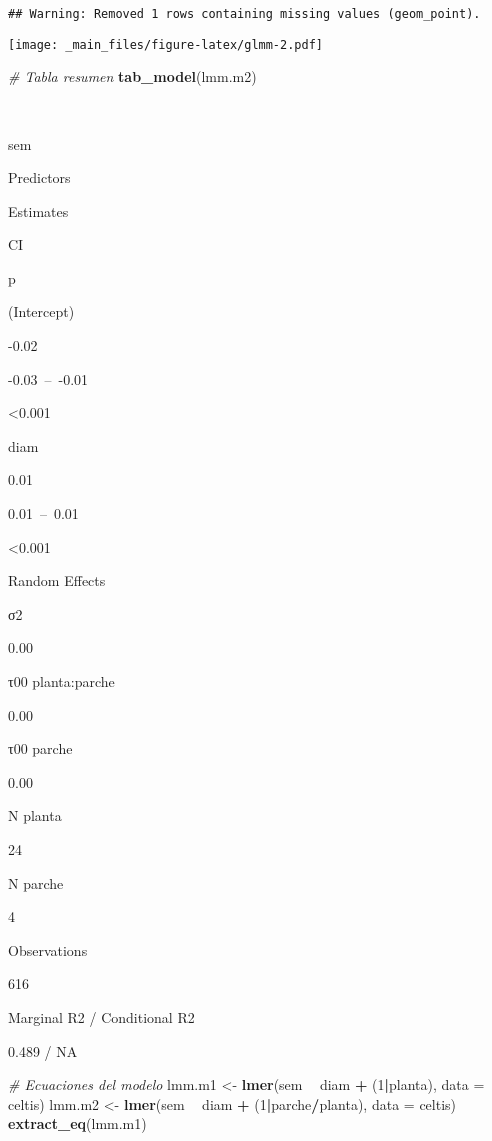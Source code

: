 \documentclass[
]{book}
\newenvironment{Shaded}{\begin{snugshade}}{\end{snugshade}}
\newcommand{\CommentTok}[1]{\textcolor[rgb]{0.56,0.35,0.01}{\textit{#1}}}
\newcommand{\DataTypeTok}[1]{\textcolor[rgb]{0.13,0.29,0.53}{#1}}
\newcommand{\DecValTok}[1]{\textcolor[rgb]{0.00,0.00,0.81}{#1}}
\newcommand{\KeywordTok}[1]{\textcolor[rgb]{0.13,0.29,0.53}{\textbf{#1}}}
\newcommand{\NormalTok}[1]{#1}
\newcommand{\OperatorTok}[1]{\textcolor[rgb]{0.81,0.36,0.00}{\textbf{#1}}}
\newcommand{\StringTok}[1]{\textcolor[rgb]{0.31,0.60,0.02}{#1}}
\begin{document}
\begin{verbatim}
## Warning: Removed 1 rows containing missing values (geom_point).
\end{verbatim}

\texttt{[image: \_main\_files/figure-latex/glmm-2.pdf]}

\begin{Shaded}
\begin{Highlighting}[]
\CommentTok{# Tabla resumen}
\KeywordTok{tab_model}\NormalTok{(lmm.m2)}
\end{Highlighting}
\end{Shaded}

~

sem

Predictors

Estimates

CI

p

(Intercept)

-0.02

-0.03~--~-0.01

\textless0.001

diam

0.01

0.01~--~0.01

\textless0.001

Random Effects

σ2

0.00

τ00 planta:parche

0.00

τ00 parche

0.00

N planta

24

N parche

4

Observations

616

Marginal R2 / Conditional R2

0.489 / NA

\begin{Shaded}
\begin{Highlighting}[]
\CommentTok{# Ecuaciones del modelo}
\NormalTok{lmm.m1 <-}\StringTok{ }\KeywordTok{lmer}\NormalTok{(sem }\OperatorTok{~}\StringTok{ }\NormalTok{diam }\OperatorTok{+}\StringTok{ }\NormalTok{(}\DecValTok{1}\OperatorTok{|}\NormalTok{planta), }\DataTypeTok{data =}\NormalTok{ celtis)}
\NormalTok{lmm.m2 <-}\StringTok{ }\KeywordTok{lmer}\NormalTok{(sem }\OperatorTok{~}\StringTok{ }\NormalTok{diam }\OperatorTok{+}\StringTok{ }\NormalTok{(}\DecValTok{1}\OperatorTok{|}\NormalTok{parche}\OperatorTok{/}\NormalTok{planta), }\DataTypeTok{data =}\NormalTok{ celtis)}
\KeywordTok{extract_eq}\NormalTok{(lmm.m1)}
\end{Highlighting}
\end{Shaded}
\end{document}
